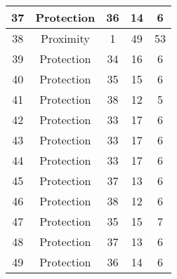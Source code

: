 \documentclass[results.tex]{subfiles}
\begin{document}
\begin{center}
\begin{tabular}{| c || c | c | c | c |}
            \hline
            37                      & Protection                   & 36                     & 14                      & 6                    \\
            \hline
            38                      & Proximity                    & 1                      & 49                      & 53                   \\
            \hline
            39                      & Protection                   & 34                     & 16                      & 6                    \\
            \hline
            40                      & Protection                   & 35                     & 15                      & 6                    \\
            \hline
            41                      & Protection                   & 38                     & 12                      & 5                    \\
            \hline
            42                      & Protection                   & 33                     & 17                      & 6                    \\
            \hline
            43                      & Protection                   & 33                     & 17                      & 6                    \\
            \hline
            44                      & Protection                   & 33                     & 17                      & 6                    \\
            \hline
            45                      & Protection                   & 37                     & 13                      & 6                    \\
            \hline
            46                      & Protection                   & 38                     & 12                      & 6                    \\
            \hline
            47                      & Protection                   & 35                     & 15                      & 7                    \\
            \hline
            48                      & Protection                   & 37                     & 13                      & 6                    \\
            \hline
            49                      & Protection                   & 36                     & 14                      & 6                    \\
            \hline
        \end{tabular}
    \end{center}
\end{document}
